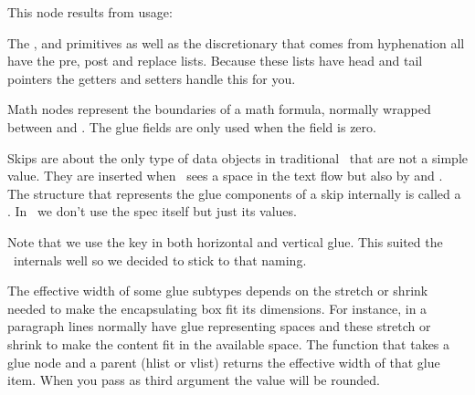 This node results from \type {\vadjust} usage:



\stopsubsection

\startsubsection[title={disc (discretionary)}]

The \typ {\discretionary}, \typ {\explicitdiscretionary} and \typ
{\automaticdiscretionary} primitives as well as the discretionary that comes from
hyphenation all have the pre, post and replace lists. Because these lists have
head and tail pointers the getters and setters handle this for you.



\stopsubsection

\startsubsection[title={math}]

Math nodes represent the boundaries of a math formula, normally wrapped between
\type {$} and \type {$}. The glue fields are only used when the 
field is zero.



\stopsubsection

\startsubsection[title={glue}]

Skips are about the only type of data objects in traditional \TEX\ that are not a
simple value. They are inserted when \TEX\ sees a space in the text flow but also
by \type {\hskip} and . The structure that represents the glue
components of a skip internally is called a . In \LUAMETATEX\ we
don't use the spec itself but just its values.


Note that we use the key  in both horizontal and vertical glue. This
suited the \TEX\ internals well so we decided to stick to that naming.

The effective width of some glue subtypes depends on the stretch or shrink needed
to make the encapsulating box fit its dimensions. For instance, in a paragraph
lines normally have glue representing spaces and these stretch or shrink to make
the content fit in the available space. The  function that
takes a glue node and a parent (hlist or vlist) returns the effective width of
that glue item. When you pass  as third argument the value will be
rounded.

